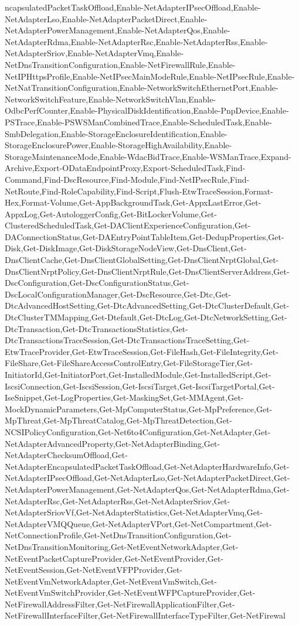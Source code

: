 {ncapsulatedPacketTaskOffload,Enable-NetAdapterIPsecOffload,Enable-NetAdapterLso,Enable-NetAdapterPacketDirect,Enable-NetAdapterPowerManagement,Enable-NetAdapterQos,Enable-NetAdapterRdma,Enable-NetAdapterRsc,Enable-NetAdapterRss,Enable-NetAdapterSriov,Enable-NetAdapterVmq,Enable-NetDnsTransitionConfiguration,Enable-NetFirewallRule,Enable-NetIPHttpsProfile,Enable-NetIPsecMainModeRule,Enable-NetIPsecRule,Enable-NetNatTransitionConfiguration,Enable-NetworkSwitchEthernetPort,Enable-NetworkSwitchFeature,Enable-NetworkSwitchVlan,Enable-OdbcPerfCounter,Enable-PhysicalDiskIdentification,Enable-PnpDevice,Enable-PSTrace,Enable-PSWSManCombinedTrace,Enable-ScheduledTask,Enable-SmbDelegation,Enable-StorageEnclosureIdentification,Enable-StorageEnclosurePower,Enable-StorageHighAvailability,Enable-StorageMaintenanceMode,Enable-WdacBidTrace,Enable-WSManTrace,Expand-Archive,Export-ODataEndpointProxy,Export-ScheduledTask,Find-Command,Find-DscResource,Find-Module,Find-NetIPsecRule,Find-NetRoute,Find-RoleCapability,Find-Script,Flush-EtwTraceSession,Format-Hex,Format-Volume,Get-AppBackgroundTask,Get-AppxLastError,Get-AppxLog,Get-AutologgerConfig,Get-BitLockerVolume,Get-ClusteredScheduledTask,Get-DAClientExperienceConfiguration,Get-DAConnectionStatus,Get-DAEntryPointTableItem,Get-DedupProperties,Get-Disk,Get-DiskImage,Get-DiskStorageNodeView,Get-DnsClient,Get-DnsClientCache,Get-DnsClientGlobalSetting,Get-DnsClientNrptGlobal,Get-DnsClientNrptPolicy,Get-DnsClientNrptRule,Get-DnsClientServerAddress,Get-DscConfiguration,Get-DscConfigurationStatus,Get-DscLocalConfigurationManager,Get-DscResource,Get-Dtc,Get-DtcAdvancedHostSetting,Get-DtcAdvancedSetting,Get-DtcClusterDefault,Get-DtcClusterTMMapping,Get-Dtefault,Get-DtcLog,Get-DtcNetworkSetting,Get-DtcTransaction,Get-DtcTransactionsStatistics,Get-DtcTransactionsTraceSession,Get-DtcTransactionsTraceSetting,Get-EtwTraceProvider,Get-EtwTraceSession,Get-FileHash,Get-FileIntegrity,Get-FileShare,Get-FileShareAccessControlEntry,Get-FileStorageTier,Get-InitiatorId,Get-InitiatorPort,Get-InstalledModule,Get-InstalledScript,Get-IscsiConnection,Get-IscsiSession,Get-IscsiTarget,Get-IscsiTargetPortal,Get-IseSnippet,Get-LogProperties,Get-MaskingSet,Get-MMAgent,Get-MockDynamicParameters,Get-MpComputerStatus,Get-MpPreference,Get-MpThreat,Get-MpThreatCatalog,Get-MpThreatDetection,Get-NCSIPolicyConfiguration,Get-Net6to4Configuration,Get-NetAdapter,Get-NetAdapterAdvancedProperty,Get-NetAdapterBinding,Get-NetAdapterChecksumOffload,Get-NetAdapterEncapsulatedPacketTaskOffload,Get-NetAdapterHardwareInfo,Get-NetAdapterIPsecOffload,Get-NetAdapterLso,Get-NetAdapterPacketDirect,Get-NetAdapterPowerManagement,Get-NetAdapterQos,Get-NetAdapterRdma,Get-NetAdapterRsc,Get-NetAdapterRss,Get-NetAdapterSriov,Get-NetAdapterSriovVf,Get-NetAdapterStatistics,Get-NetAdapterVmq,Get-NetAdapterVMQQueue,Get-NetAdapterVPort,Get-NetCompartment,Get-NetConnectionProfile,Get-NetDnsTransitionConfiguration,Get-NetDnsTransitionMonitoring,Get-NetEventNetworkAdapter,Get-NetEventPacketCaptureProvider,Get-NetEventProvider,Get-NetEventSession,Get-NetEventVFPProvider,Get-NetEventVmNetworkAdapter,Get-NetEventVmSwitch,Get-NetEventVmSwitchProvider,Get-NetEventWFPCaptureProvider,Get-NetFirewallAddressFilter,Get-NetFirewallApplicationFilter,Get-NetFirewallInterfaceFilter,Get-NetFirewallInterfaceTypeFilter,Get-NetFirewal}
